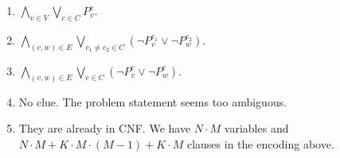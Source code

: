 \begin{exer}[1.6]
    $ $
    \begin{enumerate}[label=(\alph*)]
        \item
            $\bigwedge\limits_{v \in V} \bigvee\limits_{c \in C} P^c_v$.
        \item
            $\bigwedge\limits_{(v, w) \in E} \bigvee\limits_{c_1 \ne c_2 \in C} (\neg P_v^{c_1} \vee \neg P^{c_2}_w)$.
        \item
            $\bigwedge\limits_{(v, w) \in E} \bigvee\limits_{c \in C} (\neg P_v^c \vee \neg P^c_w)$.
        \item
            No clue.
            The problem statement seems too ambiguous.
        \item
            They are already in CNF.
            We have $N \cdot M$ variables and $N \cdot M + K \cdot M \cdot (M - 1) + K \cdot M$ clauses in the encoding above.
    \end{enumerate}
\end{exer}

